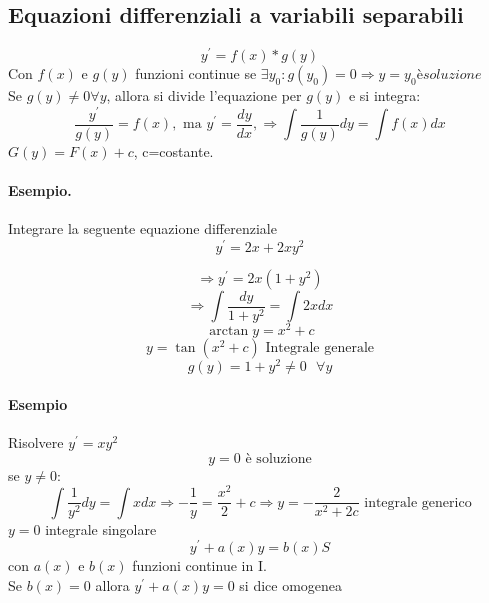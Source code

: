\subsection{Equazioni differenziali a variabili separabili}
\begin{equation}
	y^\prime=f(x)*g(y)
\end{equation}
Con $f(x)$ e $g(y)$ funzioni continue se $\exists y_0:g(y_0)=0\Rightarrow y=y_0 è soluzione$\\
Se $g(y)\neq 0 \forall y$, allora si divide l'equazione per $g(y)$ e si integra:
\begin{equation}
	\frac{y^\prime}{g(y)}=f(x), \text{ ma } y^\prime=\frac{dy}{dx}, \Rightarrow \int \frac{1}{g(y)}dy=\int f(x)dx
\end{equation}
$G(y)=F(x)+c$, c=costante.
\paragraph{Esempio.} Integrare la seguente equazione differenziale
\begin{equation*}
	y^\prime=2x+2xy^2
\end{equation*}
\begin{multicols}{2}
	\begin{equation*}
		\Rightarrow y^\prime=2x(1+y^2)
	\end{equation*}
	\begin{equation*}
		\Rightarrow \int \frac{dy}{1+y^2}=\int2xdx
	\end{equation*}
	\begin{equation*}
		\arctan y=x^2+c
	\end{equation*}
	\begin{equation*}
		y=\tan(x^2+c) \text{ Integrale generale}
	\end{equation*}
	\begin{equation*}
		g(y)=1+y^2 \neq 0\text{ } \forall y
	\end{equation*}

\end{multicols}
\paragraph{Esempio} Risolvere $y^\prime=xy^2$
\begin{equation*}
	y=0 \text{ è soluzione}
\end{equation*}
se $y\neq 0$:
\begin{equation*}
	\int\frac{1}{y^2}dy=\int xdx\Rightarrow - \frac{1}{y}=\frac{x^2}{2}+c\Rightarrow y=-\frac{2}{x^2+2c} \text{ integrale generico}
\end{equation*}
$y=0$ integrale singolare
\begin{equation*}
	y^\prime+a(x)y=b(x)S
\end{equation*}
con $a(x)$ e $b(x)$ funzioni continue in I.\\
Se $b(x)=0$ allora $y^\prime +a(x)y=0$ si dice omogenea
